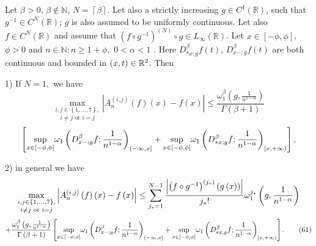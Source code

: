 \documentclass[10pt]{NSP1}
\numberwithin{equation}{section}
\begin{document}
\begin{corollary}
\label{c13} Let $\beta >0$, $\beta \notin \mathbb{N}$, $N=\left \lceil \beta
\right \rceil $. Let also a strictly increasing $g\in C^{1}\left( \mathbb{R}%
\right) $, such that $g^{-1}\in C^{N}\left( \mathbb{R}\right) $; $g$ is also
assumed to be uniformly continuous. Let also $f\in C^{N}\left( \mathbb{R}%
\right) $ and assume that $\left( f\circ g^{-1}\right) ^{\left( N\right)
}\circ g\in L_{\infty }\left( \mathbb{R}\right) $. Let $x\in \left[ -\phi
,\phi \right] $, $\phi >0$ and $n\in \mathbb{N}:n\geq 1+\phi ,$ $0<\alpha <1$
. Here $D_{\ast x;g}^{\beta }f\left( t\right) $, $D_{x-;g}^{\beta }f\left(
t\right) $ are both continuous and bounded in $\left( x,t\right) \in \mathbb{%
R}^{2}$. Then

1) If $N=1,$ we have
\begin{equation}
\underset{i\neq j\text{ or }i=j}{\underset{i,j\in \left \{ 1,...,7\right \} ,%
}{\max }}\left \vert A_{n}^{\left( i,j\right) }\left( f\right) \left(
x\right) -f\left( x\right) \right \vert \leq \frac{\omega _{1}^{\beta
}\left( g,\frac{1}{n^{1-\alpha }}\right) }{\Gamma \left( \beta +1\right) }
\tag{60}  \label{60}
\end{equation}
\begin{equation*}
\left[ \underset{x\in \left[ -\phi ,\phi \right] }{\sup }\omega _{1}\left(
D_{x-;g}^{\beta }f;\frac{1}{n^{1-\alpha }}\right) _{(-\infty ,x]}+\underset{%
x\in \left[ -\phi ,\phi \right] }{\sup }\omega _{1}\left( D_{\ast
x;g}^{\beta }f;\frac{1}{n^{1-\alpha }}\right) _{[x,+\infty )}\right] ,
\end{equation*}

2) in general we have
\begin{equation*}
\underset{i\neq j\text{ or }i=j}{\underset{i,j\in \left \{ 1,...,7\right \} ,%
}{\max }}\left \vert A_{n}^{\left( i,j\right) }\left( f\right) \left(
x\right) -f\left( x\right) \right \vert \leq \sum_{j_{\ast }=1}^{N-1}\frac{%
\left \vert \left( f\circ g^{-1}\right) ^{\left( j_{\ast }\right) }\left(
g\left( x\right) \right) \right \vert }{j_{\ast }!}\omega _{1}^{j_{\ast
}}\left( g,\frac{1}{n^{1-\alpha }}\right)
\end{equation*}
\begin{equation}
+\frac{\omega _{1}^{\beta }\left( g,\frac{1}{n^{1-\alpha }}\right) }{\Gamma
\left( \beta +1\right) }\left[ \underset{x\in \left[ -\phi ,\phi \right] }{%
\sup }\omega _{1}\left( D_{x-;g}^{\beta }f;\frac{1}{n^{1-\alpha }}\right)
_{(-\infty ,x]}+\underset{x\in \left[ -\phi ,\phi \right] }{\sup }\omega
_{1}\left( D_{\ast x;g}^{\beta }f;\frac{1}{n^{1-\alpha }}\right)
_{[x,+\infty )}\right] .  \tag{61}  \label{61}
\end{equation}
\end{corollary}
\end{document}
